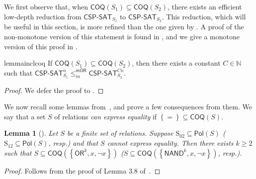 \documentclass[10pt,a4paper]{article}
\newtheorem{lemma}[theorem]{Lemma}
\newcommand{\complexityfont}[1]{\mathsf{#1}}
\def\OR           {\complexityfont{OR}}
\def\NAND         {\complexityfont{NAND}}
\def\sseq{\subseteq}
\newcommand{\set}[1]{\left\{#1\right\}}
\newcommand{\CSPf}[1]{\mathsf{CSP}\text{-}\mathsf{SAT}_{#1}}
\newcommand{\CSPfn}[2]{\CSPf{#1}^{#2}}
\newcommand{\COQ}{\mathsf{COQ}}
\newcommand{\Pol}{\mathsf{Pol}}
\newcommand{\mormred}{\leq^{\mathsf{mOR}}_m}
\newcommand{\clonefont}[1]{\mathrm{#1}}
\def\bbn{{\mathbb N}}
\begin{document}
We first observe that, when $\COQ(S_1) \sseq \COQ(S_2)$,
there exists an efficient low-depth reduction
from $\CSPf{S_1}$ to $\CSPf{S_2}$.
This reduction, which will be useful in this section,
is more refined than the one given by
.
A proof of the non-monotone version of this statement
is found in
\cite[Proposition 2.3]{playing_two},
and we give a monotone version of this proof in
.

\begin{restatable}{lemma}{inclcoq}
    \label{prop:incl-coq}
    If $\COQ(S_1) \sseq \COQ(S_2)$,
    then
    there exists a constant $C \in \bbn$ such that
    $\CSPfn{S_1}{n} \mormred \CSPfn{S_2}{C n}$.
\end{restatable}
\begin{proof}
    We defer the proof to
    .
\end{proof}

We now recall some lemmas
from~\cite{DBLP:journals/jcss/AllenderBISV09},
and prove a few consequences from them.
We say that a set $S$ of relations \emph{can express equality} if
$\set{=} \sseq \COQ(S)$.

\begin{lemma}[\cite{DBLP:journals/jcss/AllenderBISV09}]
    \label{lem:coq-no-eq}
    Let $S$ be a finite set of relations.
    Suppose
    $\clonefont{S_{02}} \sseq \Pol(S)$
    ($\clonefont{S_{12}} \sseq \Pol(S)$, resp.)
    and that $S$ cannot express equality.
    Then there exists $k \geq 2$
    such that
    $S \sseq \COQ(\set{\OR^k, x, \neg x})$
    ($S \sseq \COQ(\set{\NAND^k, x, \neg x})$, resp.).
\end{lemma}
\begin{proof}
    Follows from the proof of Lemma 3.8
    of~\cite{DBLP:journals/jcss/AllenderBISV09}.
\end{proof}
\end{document}
